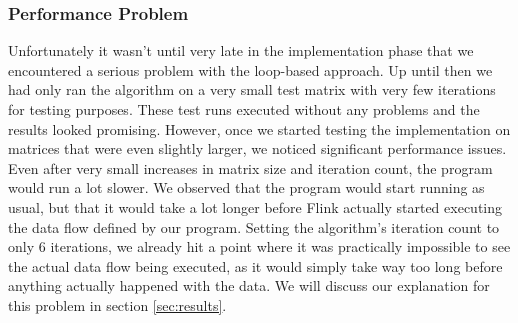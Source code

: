 
\subsubsection{Performance Problem}

Unfortunately it wasn't until very late in the implementation phase that we
encountered a serious problem with the loop-based approach. Up until then we
had only ran the algorithm on a very small test matrix with very few
iterations for testing purposes. These test runs executed without any problems
and the results looked promising. However, once we started testing the
implementation on matrices that were even slightly larger, we noticed
significant performance issues. Even after very small increases in matrix size
and iteration count, the program would run a lot slower. We observed that the
program would start running as usual, but that it would take a lot longer
before Flink actually started executing the data flow defined by our program.
Setting the algorithm's iteration count to only 6 iterations, we already hit a
point where it was practically impossible to see the actual data flow being
executed, as it would simply take way too long before anything actually
happened with the data. We will discuss our explanation for this problem in
section \ref{sec:results}.


